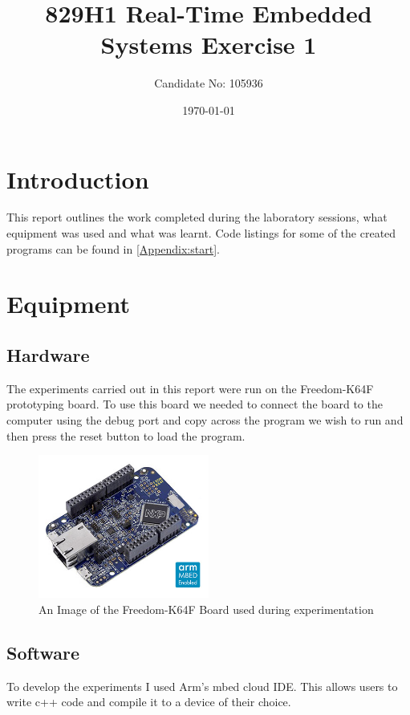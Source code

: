 \documentclass[a4paper,12pt]{scrartcl}
\title{829H1 Real-Time Embedded Systems Exercise 1}
\author{Candidate No: 105936}
\date{\today}
\begin{document}
	
	\begin{titlepage}
		\maketitle
	\end{titlepage}
	
	\tableofcontents
	\newpage
	
	\section{Introduction}
	{
		This report outlines the work completed during the laboratory sessions, what equipment was used and what was learnt. Code listings for some of the created programs can be found in \cref{Appendix:start}.
	}

	\section{Equipment}
	{
		\subsection{Hardware}{
			The experiments carried out in this report were run on the Freedom-K64F prototyping board\cite{nxpproducts2014}. To use this board we needed to connect the board to the computer using the debug port and copy across the program we wish to run and then press the reset button to load the program.
			\begin{figure}[h]
				\centering
				\includegraphics[width=0.5\textwidth]{FRDM-K64F-ANGLE}
				\caption{An Image of the Freedom-K64F Board used during experimentation\cite{nxpproducts2014}}
				\label{img:FRDM-K64F}
			\end{figure}
		}
		\subsection{Software}
		{
			To develop the experiments I used Arm's mbed cloud IDE. This allows users to write c++ code and compile it to a device of their choice. 
		}
	}
	
\end{document}
